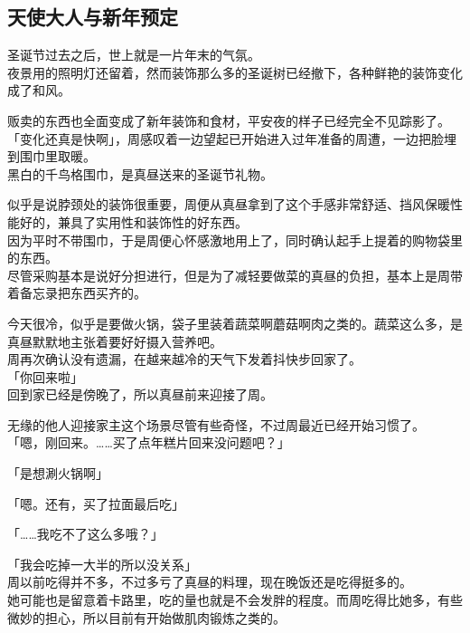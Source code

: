 \subsection{天使大人与新年预定}

圣诞节过去之后，世上就是一片年末的气氛。\\

夜景用的照明灯还留着，然而装饰那么多的圣诞树已经撤下，各种鲜艳的装饰变化成了和风。

贩卖的东西也全面变成了新年装饰和食材，平安夜的样子已经完全不见踪影了。\\

「变化还真是快啊」，周感叹着一边望起已开始进入过年准备的周遭，一边把脸埋到围巾里取暖。\\

黑白的千鸟格围巾，是真昼送来的圣诞节礼物。

似乎是说脖颈处的装饰很重要，周便从真昼拿到了这个手感非常舒适、挡风保暖性能好的，兼具了实用性和装饰性的好东西。\\

因为平时不带围巾，于是周便心怀感激地用上了，同时确认起手上提着的购物袋里的东西。\\

尽管采购基本是说好分担进行，但是为了减轻要做菜的真昼的负担，基本上是周带着备忘录把东西买齐的。

今天很冷，似乎是要做火锅，袋子里装着蔬菜啊蘑菇啊肉之类的。蔬菜这么多，是真昼默默地主张着要好好摄入营养吧。\\

周再次确认没有遗漏，在越来越冷的天气下发着抖快步回家了。\\

「你回来啦」\\

回到家已经是傍晚了，所以真昼前来迎接了周。

无缘的他人迎接家主这个场景尽管有些奇怪，不过周最近已经开始习惯了。\\

「嗯，刚回来。……买了点年糕片回来没问题吧？」

「是想涮火锅啊」

「嗯。还有，买了拉面最后吃」

「……我吃不了这么多哦？」

「我会吃掉一大半的所以没关系」\\

周以前吃得并不多，不过多亏了真昼的料理，现在晚饭还是吃得挺多的。\\

她可能也是留意着卡路里，吃的量也就是不会发胖的程度。而周吃得比她多，有些微妙的担心，所以目前有开始做肌肉锻炼之类的。\\

